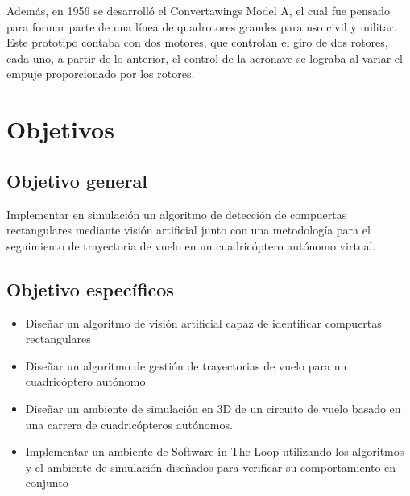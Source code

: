 Además, en 1956 se desarrolló el Convertawings Model A, el cual fue pensado para formar parte de una línea de quadrotores grandes para uso civil y militar. Este prototipo contaba con dos motores, que controlan el giro de dos rotores, cada uno, a partir de lo anterior, el control de la aeronave se lograba al variar el empuje proporcionado por los rotores.





\section{Objetivos}
\subsection{Objetivo general}

Implementar en simulación un algoritmo de detección de compuertas rectangulares mediante visión artificial junto con una metodología para el seguimiento de trayectoria de vuelo en un cuadricóptero autónomo virtual.

\subsection{Objetivo específicos}

\begin{itemize}
    \item Diseñar un algoritmo de visión artificial capaz de identificar compuertas rectangulares 
    \item Diseñar un algoritmo de gestión de trayectorias de vuelo para un cuadricóptero autónomo 
    \item Diseñar un ambiente de simulación en 3D de un circuito de vuelo basado en una carrera de cuadricópteros autónomos. 
    \item Implementar un ambiente de Software in The Loop utilizando los algoritmos y el ambiente de simulación diseñados para verificar su comportamiento en conjunto 
\end{itemize}

